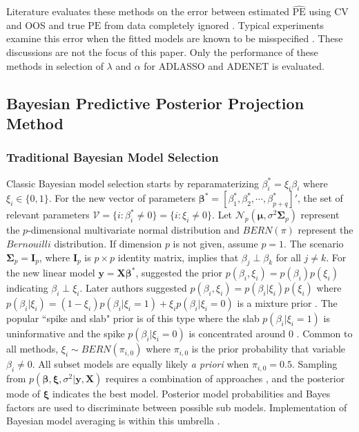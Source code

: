 Literature evaluates these methods on the error between estimated $\widehat{\textrm{PE}}$ using CV and OOS and true $\textrm{PE}$ from data completely ignored \citep{Bergmeir2014,Bergmeir2018}. Typical experiments examine this error when the fitted models are known to be misspecified \citep{Burman1994,Racine2000,Bergmeir2018}. These discussions are not the focus of this paper. Only the performance of these methods in selection of $\lambda$ and $\alpha$ for ADLASSO and ADENET is evaluated. 

\subsection{Bayesian Predictive Posterior Projection Method}
\subsubsection{Traditional Bayesian Model Selection}
Classic Bayesian model selection starts by reparamaterizing $\beta_i^*=\xi_i\beta_i$ where $\xi_i\in\{0,1\}$. For the new vector of parameters $\bm{\beta}^*=[\beta^*_1,\beta^*_2,\cdots,\beta^*_{p+q}]'$, the set of relevant parameters $\mathcal{V}=\{i:\beta^*_i\neq 0\}=\{i:\xi_i\neq 0\}$. Let $\mathcal{N}_p(\bm{\mu},\sigma^2\bm{\Sigma}_p)$ represent the $p$-dimensional multivariate normal distribution and $BERN(\pi)$ represent the $Bernouilli$ distribution. If dimension $p$ is not given, assume $p=1$. The scenario $\bm{\Sigma}_p=\bm{I}_p$, where $\bm{I}_p$ is $p\times p$ identity matrix, implies that $\beta_j\perp\beta_k$ for all $j\neq k$. For the new linear model  $\bm{y}=\bm{X}\bm{\beta}^*$, \cite{Kuo1998} suggested the prior $p(\beta_i,\xi_i)=p(\beta_i)p(\xi_i)$ indicating $\beta_i \perp \xi_i$. Later authors suggested $p(\beta_i,\xi_i)=p(\beta_i|\xi_i)p(\xi_i)$ where $p(\beta_i|\xi_i)=(1-\xi_i)p(\beta_i|\xi_i=1)+\xi_i p(\beta_i|\xi_i=0) $ is a mixture prior \citep{Carlin1995}. The popular ``spike and slab" prior is of this type where the slab $p(\beta_i|\xi_i=1)$ is uninformative and the spike $p(\beta_i|\xi_i=0)$ is concentrated around 0 \citep{Mitchell1988,George1993, Carlin1995}. Common to all methods, $\xi_i \sim BERN(\pi_{i,0})$ where $\pi_{i,0}$ is the prior probability that variable $\beta_i \neq 0$. All subset models are equally likely \textit{a priori} when $\pi_{i,0}=0.5$. Sampling from $p(\bm{\beta},\bm{\xi},\sigma^2|\bm{y},\bm{X})$ requires a combination of approaches \citep{Dellaportas2002}, and the posterior mode of $\bm{\xi}$ indicates the best model. Posterior model probabilities and Bayes factors are used to discriminate between possible sub models. Implementation of Bayesian model averaging is within this umbrella \citep{Raftery1997,Hoeting1998,Hoeting1999}.

